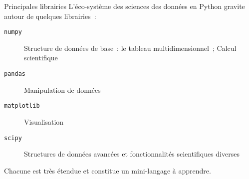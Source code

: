 \begin{frame}{Principales librairies}
  L'éco-système des sciences des données en Python gravite autour de quelques librairies~:
  \begin{description}
    \item[\texttt{numpy}] Structure de données de base~: le tableau multidimensionnel~; Calcul scientifique
    \item[\texttt{pandas}] Manipulation de données
    \item[\texttt{matplotlib}] Visualisation
    \item[\texttt{scipy}] Structures de données avancées et fonctionnalités scientifiques diverses
  \end{description}
  Chacune est très étendue et constitue un mini-langage à apprendre.
\end{frame}
